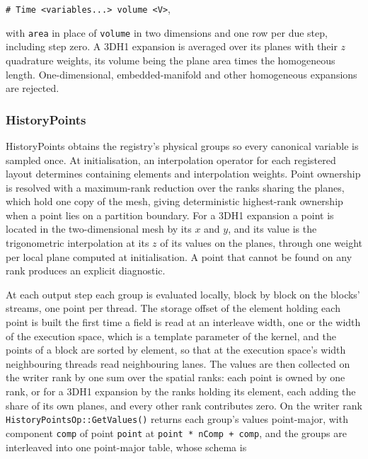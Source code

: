 \begin{center}
\texttt{\# Time <variables...> volume <V>},
\end{center}

with \texttt{area} in place of \texttt{volume} in two dimensions and one row
per due step, including step zero. A 3DH1 expansion is averaged over its
planes with their $z$ quadrature weights, its volume being the plane area times
the homogeneous length. One-dimensional, embedded-manifold and other
homogeneous expansions are rejected.

\subsubsection{HistoryPoints}

HistoryPoints obtains the registry's physical groups so every canonical
variable is sampled once. At initialisation, an interpolation operator for each
registered layout determines containing elements and interpolation weights.
Point ownership is resolved with a maximum-rank reduction over the ranks
sharing the planes, which hold one copy of the mesh, giving deterministic
highest-rank ownership when a point lies on a partition boundary. For a 3DH1
expansion a point is located in the two-dimensional mesh by its $x$ and $y$,
and its value is the trigonometric interpolation at its $z$ of its values on
the planes, through one weight per local plane computed at initialisation. A point that
cannot be found on any rank produces an explicit diagnostic.

At each output step each group is evaluated locally, block by block on the
blocks' streams, one point per thread. The storage offset of the element
holding each point is built the first time a field is read at an interleave
width, one or the width of the execution space, which is a template parameter
of the kernel, and the points of a block are sorted by element, so that at the execution
space's width neighbouring threads read neighbouring lanes. The values are then
collected on the writer rank by one sum over the spatial ranks: each point is
owned by one rank, or for a 3DH1 expansion by the ranks holding its element,
each adding the share of its own planes, and every other rank contributes
zero. On the writer rank \texttt{HistoryPointsOp::GetValues()} returns each
group's values point-major, with component \texttt{comp} of point
\texttt{point} at \texttt{point * nComp + comp}, and the groups are
interleaved into one point-major table, whose schema is

